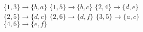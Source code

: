 \begin{enumerate}
\begin{itemize}
{
                
                    $\{1,3\} \to \{b, a\}$ \tab
                    $\{1,5\} \to \{b, c\}$ \tab
                    $\{2,4\} \to \{d, e\}$ \\
                    $\{2,5\} \to \{d, c\}$ \tab
                    $\{2,6\} \to \{d, f\}$ \tab
                    $\{3,5\} \to \{a, c\}$ \\
                    $\{4,6\} \to \{e, f\}$
                }{}
        \end{itemize}
        
            
            

\end{enumerate}
